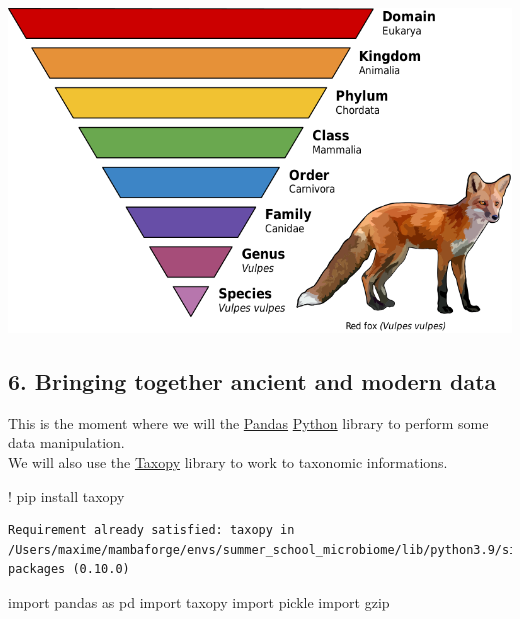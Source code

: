 \documentclass[
  letterpaper,
]{book}
\newenvironment{Shaded}{}{}
\newcommand{\ImportTok}[1]{\textcolor[rgb]{0.01,0.18,0.38}{#1}}
\newcommand{\NormalTok}[1]{\textcolor[rgb]{0.14,0.16,0.18}{#1}}
\newcommand{\OperatorTok}[1]{\textcolor[rgb]{0.14,0.16,0.18}{#1}}
\begin{document}
\includegraphics{assets/images/chapters/taxonomic-profiling/800px-Taxonomic_Rank_Graph.svg.png}

\hypertarget{bringing-together-ancient-and-modern-data}{%
\subsection{6. Bringing together ancient and modern
data}\label{bringing-together-ancient-and-modern-data}}

This is the moment where we will the
\href{https://pandas.pydata.org}{Pandas}
\href{https://www.python.org/}{Python} library to perform some data
manipulation.\\
We will also use the \href{https://github.com/apcamargo/taxopy}{Taxopy}
library to work to taxonomic informations.

\begin{Shaded}
\begin{Highlighting}[]
\OperatorTok{!}\NormalTok{ pip install taxopy}
\end{Highlighting}
\end{Shaded}

\begin{verbatim}
Requirement already satisfied: taxopy in /Users/maxime/mambaforge/envs/summer_school_microbiome/lib/python3.9/site-packages (0.10.0)
\end{verbatim}

\begin{Shaded}
\begin{Highlighting}[]
\ImportTok{import}\NormalTok{ pandas }\ImportTok{as}\NormalTok{ pd}
\ImportTok{import}\NormalTok{ taxopy}
\ImportTok{import}\NormalTok{ pickle}
\ImportTok{import}\NormalTok{ gzip}
\end{Highlighting}
\end{Shaded}
\end{document}
